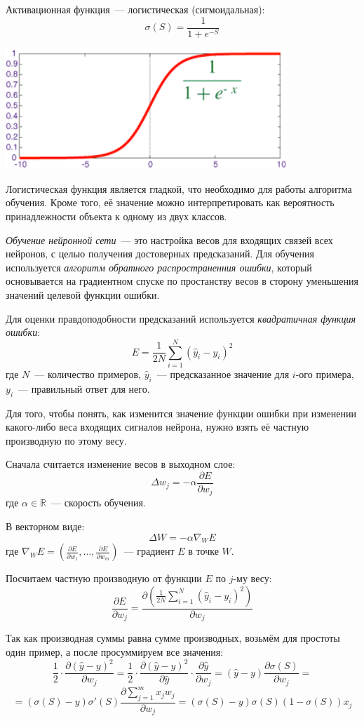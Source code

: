 	Активационная функция~--- логистическая (сигмоидальная):
	\[
		\sigma\left(S\right) = \frac{1}{1 + e^{-S}}
	\]
	\parskip=0cm

	\includegraphics[width=400px]{picture2.png}
	\parskip=0.2cm

	Логистическая функция является гладкой, что необходимо для работы алгоритма обучения. Кроме того, её значение можно
	интерпретировать как вероятность принадлежности объекта к одному из двух классов.

	\textit{Обучение нейронной сети}~--- это настройка весов для входящих связей всех нейронов, с целью получения достоверных предсказаний.
	Для обучения используется \textit{алгоритм обратного распространенния ошибки}, который основывается на градиентном спуске по простанству
	весов в сторону уменьшения значений целевой функции ошибки.

	Для оценки правдоподобности предсказаний используется \textit{квадратичная функция ошибки}:
	\[
		E = \frac{1}{2N}\sum_{i = 1}^N \left(\hat y_i - y_i\right)^2
	\]
	где $N$~--- количество примеров, $\hat y_i$~--- предсказанное значение для $i$-ого примера, $y_i$~--- правильный ответ для него.

	Для того, чтобы понять, как изменится значение функции ошибки при изменении какого-либо веса входящих сигналов нейрона,
	нужно взять её частную производную по этому весу.

	Сначала считается изменение весов в выходном слое:
	\[
		\Delta w_j = -\alpha\frac{\partial E}{\partial w_j}
	\]
	где $\alpha \in \mathbb R$~--- скорость обучения.

	В векторном виде:
	\[
		\Delta W = -\alpha\nabla_W E
	\]
	где $\nabla_W E = \left(\frac{\partial E}{\partial w_1},\dots,\frac{\partial E}{\partial w_m}\right)$~--- градиент $E$ в точке $W$.

	Посчитаем частную производную от функции $E$ по $j$-му весу:
	\[
		\frac{\partial E}{\partial w_j}	= \frac{\partial\left(\frac{1}{2N}\sum_{i = 1}^N \left(\hat y_i - y_i\right)^2\right)}{\partial w_j}
	\]
	
	Так как производная суммы равна сумме производных, возьмём для простоты один пример, а после просуммируем все значения:
	\[
		\frac{1}{2}\cdot\frac{\partial{\left(\hat y - y\right)^2}}{\partial w_j} =
		\frac{1}{2}\cdot\frac{\partial\left(\hat y - y\right)^2}{\partial\hat y}\cdot\frac{\partial\hat y}{\partial w_j} =
		\left(\hat y - y\right)\frac{\partial\sigma\left(S\right)}{\partial w_j} =
	\]
	\[
		= \left(\sigma\left(S\right) - y\right)\sigma\prime\left(S\right)\frac{\partial\sum_{j = 1}^m x_j w_j}{\partial w_j} =
		\left(\sigma\left(S\right) - y\right)\sigma\left(S\right)\left(1 - \sigma\left(S\right)\right) x_j
	\]

